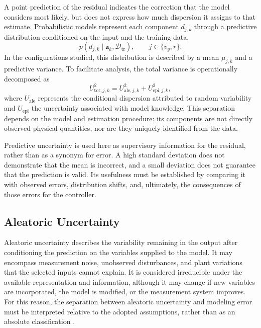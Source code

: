 \documentclass[12pt,a4paper]{report}
\begin{document}
A point prediction of the residual indicates the correction that the model considers most likely, but does not express how much dispersion it assigns to that estimate. Probabilistic models represent each component $d_{j,k}$ through a predictive distribution conditioned on the input and the training data,
\begin{equation}
    p\!\left(d_{j,k}\mid\mathbf{z}_k,\mathcal{D}_{\mathrm{tr}}\right),
    \qquad j\in\{v_y,r\}.
    \label{eq:predictive_residual_distribution}
\end{equation}
In the configurations studied, this distribution is described by a mean $\mu_{j,k}$ and a predictive variance. To facilitate analysis, the total variance is operationally decomposed as
\begin{equation}
    U^2_{\mathrm{tot},j,k}
    =
    U^2_{\mathrm{ale},j,k}
    +
    U^2_{\mathrm{epi},j,k},
    \label{eq:predictive_uncertainty_decomposition}
\end{equation}
where $U_{\mathrm{ale}}$ represents the conditional dispersion attributed to random variability and $U_{\mathrm{epi}}$ the uncertainty associated with model knowledge. This separation depends on the model and estimation procedure: its components are not directly observed physical quantities, nor are they uniquely identified from the data.

Predictive uncertainty is used here as supervisory information for the residual, rather than as a synonym for error. A high standard deviation does not demonstrate that the mean is incorrect, and a small deviation does not guarantee that the prediction is valid. Its usefulness must be established by comparing it with observed errors, distribution shifts, and, ultimately, the consequences of those errors for the controller.

\subsection{Aleatoric Uncertainty}


Aleatoric uncertainty describes the variability remaining in the output after conditioning the prediction on the variables supplied to the model. It may encompass measurement noise, unobserved disturbances, and plant variations that the selected inputs cannot explain. It is considered irreducible under the available representation and information, although it may change if new variables are incorporated, the model is modified, or the measurement system improves. For this reason, the separation between aleatoric uncertainty and modeling error must be interpreted relative to the adopted assumptions, rather than as an absolute classification \cite{Brunke2022Safe}.
\end{document}
